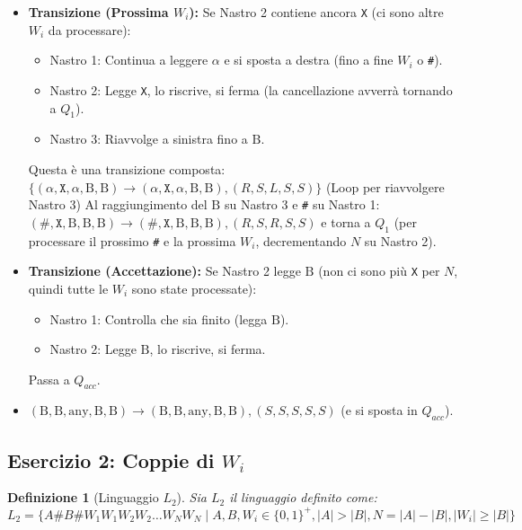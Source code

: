 \documentclass[a4paper]{article}
\newtheorem{definition}{Definizione}
\newcommand{\B}{\text{B}} %
\begin{document}
\begin{itemize}
        \begin{itemize}
            \item \textbf{Transizione (Prossima $W_i$):}
                Se Nastro 2 contiene ancora \texttt{X} (ci sono altre $W_i$ da processare):
                \begin{itemize}
                    \item Nastro 1: Continua a leggere $\alpha$ e si sposta a destra (fino a fine $W_i$ o \texttt{\#}).
                    \item Nastro 2: Legge \texttt{X}, lo riscrive, si ferma (la cancellazione avverrà tornando a $Q_1$).
                    \item Nastro 3: Riavvolge a sinistra fino a $\B$.
                \end{itemize}
                Questa è una transizione composta:
                $\{ (\alpha, \texttt{X}, \alpha, \B, \B) \to (\alpha, \texttt{X}, \alpha, \B, \B), (R,S,L,S,S) \}$ (Loop per riavvolgere Nastro 3)
                Al raggiungimento del $\B$ su Nastro 3 e \texttt{\#} su Nastro 1:
                $(\texttt{\#}, \texttt{X}, \B, \B, \B) \to (\texttt{\#}, \texttt{X}, \B, \B, \B), (R,S,R,S,S)$ e torna a $Q_1$ (per processare il prossimo \texttt{\#} e la prossima $W_i$, decrementando $N$ su Nastro 2).
            \item \textbf{Transizione (Accettazione):}
                Se Nastro 2 legge $\B$ (non ci sono più \texttt{X} per $N$, quindi tutte le $W_i$ sono state processate):
                \begin{itemize}
                    \item Nastro 1: Controlla che sia finito (legga $\B$).
                    \item Nastro 2: Legge $\B$, lo riscrive, si ferma.
                \end{itemize}
                Passa a $Q_{acc}$.
                \item $(\B, \B, \text{any}, \B, \B) \to (\B, \B, \text{any}, \B, \B), (S,S,S,S,S)$ (e si sposta in $Q_{acc}$).
        \end{itemize}
\end{itemize}

\subsection{Esercizio 2: Coppie di $W_i$}

\begin{definition}[Linguaggio $L_2$]
Sia $L_2$ il linguaggio definito come:
$L_2 = \{ A\texttt{\#}B\texttt{\#}W_1 W_1 W_2 W_2 \dots W_N W_N \mid A, B, W_i \in \{0,1\}^+, |A| > |B|, N = |A| - |B|, |W_i| \ge |B| \}$
\end{definition}
\end{document}
